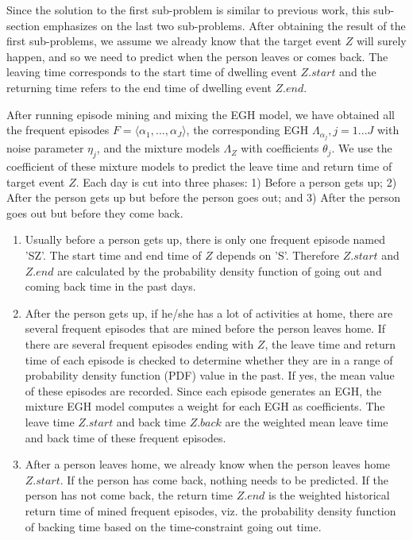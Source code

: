 Since the solution to the first sub-problem is similar to 
previous work, 
this sub-section emphasizes on the last two sub-problems. 
After obtaining the result of the first sub-problems, 
we assume we already know that the target event $Z$ will surely happen, 
and so we need to predict when the person leaves or comes back. 
The leaving time corresponds to the start time of dwelling event $Z.start$ and 
the returning time refers to the end time of dwelling event $Z.end$. 

After running episode mining and mixing the EGH model, 
we have obtained all the frequent episodes $F=\langle \alpha_1,..., \alpha_J \rangle$, 
the corresponding EGH $\Lambda_{\alpha_j}, j=1...J$ with noise parameter $\eta_j$, 
and the mixture models $\Lambda_Z$ with coefficients $\theta_j$.
We use the coefficient of these mixture models to predict the leave time and return time of 
target event $Z$. 
 Each day is cut into three phases: 1) Before a person gets up; 
2) After the person gets up but before the person goes out;
and 3) After the person goes out but before they come back. 
\begin{enumerate}
\item
Usually before a person gets up, there is only one frequent episode named 'SZ'. 
The start time and end time of $Z$ depends on 'S'. 
Therefore $Z.start$ and $Z.end$  are calculated by the probability density function of 
going out and coming back time in the past days. 
\item
After the person gets up, if he/she has a lot of activities at home, 
there are several frequent episodes that are mined before the person leaves home. 
If there are several frequent episodes ending with $Z$,  
the leave time and return time of each episode is checked to determine
whether they are in a range of probability density function (PDF) value in the past. 
If yes, the mean value of these episodes are recorded. 
Since each episode generates an EGH, 
the mixture EGH model computes a weight for each EGH as coefficients. 
The leave time $Z.start$ and back time $Z.back$ are 
the weighted mean leave time and back time of these frequent episodes. 
\item
After a person leaves home, 
we already know when the person leaves home $Z.start$. 
If the person has come back, 
nothing needs to be predicted. 
If the person has not come back,  
the return time $Z.end$ is the weighted 
 historical return time of mined 
frequent episodes, 
viz. the probability density function of backing time based on the 
time-constraint going out time.
\end{enumerate}


 





